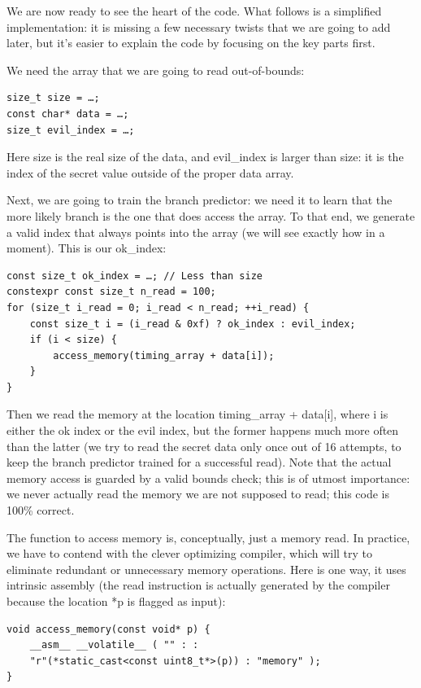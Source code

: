 We are now ready to see the heart of the code. What follows is a simplified  implementation: it is missing a few necessary twists that we are going to add later, but it's easier to explain the code by focusing on the key parts first.

We need the array that we are going to read out-of-bounds:

\begin{lstlisting}[style=styleCXX]
size_t size = …;
const char* data = …;
size_t evil_index = …;
\end{lstlisting}

Here size is the real size of the data, and evil\_index is larger than size: it is the index of the secret value outside of the proper data array.

Next, we are going to train the branch predictor: we need it to learn that the more likely branch is the one that does access the array. To that end, we generate a valid index that always points into the array (we will see exactly how in a moment). This is our ok\_index:

\begin{lstlisting}[style=styleCXX]
const size_t ok_index = …; // Less than size
constexpr const size_t n_read = 100;
for (size_t i_read = 0; i_read < n_read; ++i_read) {
	const size_t i = (i_read & 0xf) ? ok_index : evil_index;
	if (i < size) {
		access_memory(timing_array + data[i]);
	}
}
\end{lstlisting}

Then we read the memory at the location timing\_array + data[i], where i is either the ok index or the evil index, but the former happens much more often than the latter (we try to read the secret data only once out of 16 attempts, to keep the branch predictor trained for a successful read). Note that the actual memory access is guarded by a valid bounds check; this is of utmost importance: we never actually read the memory we are not supposed to read; this code is 100\% correct.

The function to access memory is, conceptually, just a memory read. In practice, we have to contend with the clever optimizing compiler, which will try to eliminate redundant or unnecessary memory operations. Here is one way, it uses intrinsic assembly (the read instruction is actually generated by the compiler because the location *p is flagged as input):

\begin{lstlisting}[style=styleCXX]
void access_memory(const void* p) {
	__asm__ __volatile__ ( "" : :
	"r"(*static_cast<const uint8_t*>(p)) : "memory" );
}
\end{lstlisting}

